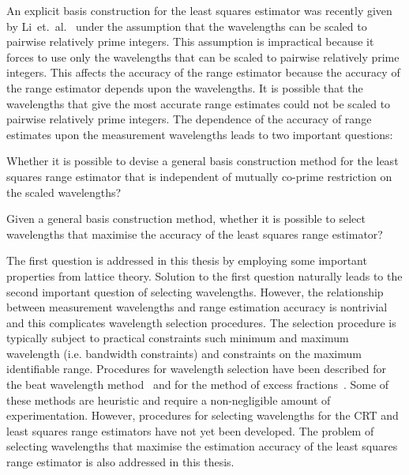 An explicit basis construction for the least squares estimator was recently given by Li~et.~al.~\cite{Li_distance_est_wrapped_phase} under the assumption that the wavelengths can be scaled to pairwise relatively prime integers. This assumption is impractical because it forces to use only the wavelengths that can be scaled to pairwise relatively prime integers. %
This affects the accuracy of the range estimator because the accuracy of the range estimator depends upon the wavelengths. It is possible that the wavelengths that give the most accurate range estimates could not be scaled to pairwise relatively prime integers. The dependence of the accuracy of range estimates upon the measurement wavelengths leads to two important questions:
\begin{itemise}
\item{Whether it is possible to devise a general basis construction method for the least squares range estimator that is independent of mutually co-prime restriction on the scaled wavelengths?}
\item{Given a general basis construction method, whether it is possible to select wavelengths that maximise the accuracy of the least squares range estimator?}
\end{itemise}
The first question is addressed in this thesis by employing some important properties from lattice theory. Solution to the first question naturally leads to the second important question of selecting wavelengths.
However, the relationship between measurement wavelengths and range estimation accuracy is nontrivial and this complicates wavelength selection procedures. The selection procedure is typically subject to practical constraints such minimum and maximum wavelength (i.e. bandwidth constraints) and constraints on the maximum identifiable range. Procedures for wavelength selection have been described for the beat wavelength method~\cite{Towers_frequency_selection_interferometry_2003} and for the method of excess fractions~\cite{Falaggis_excess_fractions_2012}.  Some of these methods are heuristic and require a non-negligible amount of experimentation.  However, procedures for selecting wavelengths for the CRT and least squares range estimators have not yet been developed. The problem of selecting wavelengths that maximise the estimation accuracy of the least squares range estimator is also addressed in this thesis.

